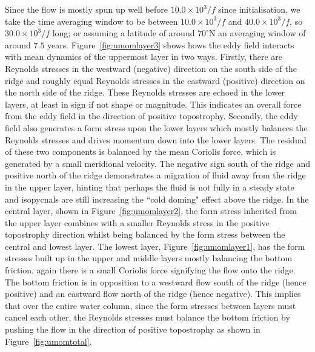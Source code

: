 \documentclass[12pt,a4paper]{report}
\newcommand*\figref[1]{Figure~\ref{#1}}
\begin{document}
 Since the flow is mostly spun up well before $10.0\times10^{3}/f$ since initialisation, we take the time averaging window to be between $10.0\times10^{3}/f$ and $40.0\times10^{3}/f$, so $30.0\times10^{3}/f$ long; or assuming a latitude of around  $70^{\circ}\mathrm{N}$ an
 averaging window of around $7.5$ years. 
 \figref{fig:umomlayer3} shows hows the eddy field interacts with mean dynamics of the
 uppermost layer
 in two ways. Firstly, there are Reynolds stresses in the westward (negative) direction
 on the south side of the ridge and roughly equal Reynolds stresses in the eastward (positive) direction on the north side of the ridge. These Reynolds
 stresses are echoed in the lower layers, at least in sign if not shape or magnitude.
 This indicates an overall force from the eddy field in the direction of 
 positive topostrophy. Secondly, the eddy field also generates a form stress
 upon the lower layers which mostly balances the Reynolds stresses and drives
 momentum down into the lower layers. The residual of these two components is balanced
 by the mean Coriolis force, which is generated by a small meridional velocity.
 The negative sign south of the ridge and positive north of the ridge demonstrates
 a migration of fluid away from the ridge in the upper layer, hinting that perhaps
 the fluid is not fully in a steady state and isopycnals are still increasing the 
 ``cold doming" effect above the ridge. In the central layer, shown in
 \figref{fig:umomlayer2}, the form stress inherited
 from the upper layer combines with a smaller Reynolds stress in the positive topostrophy
 direction whilst being balanced by the form stress between the central and lowest layer.
 The lowest layer, \figref{fig:umomlayer1}, has the form stresses built up in the 
 upper and middle layers mostly balancing the bottom friction, again
 there is a small Coriolis force signifying the flow onto the ridge. The bottom friction is 
 in opposition to a westward flow south of the ridge (hence positive) and an eastward
 flow north of the ridge (hence negative). This implies that over the entire
 water column, since the form stresses between layers must cancel each other, the 
 Reynolds stresses must balance the bottom friction by pushing the flow in the direction 
 of positive topostrophy as shown in \figref{fig:umomtotal}. 
 
 
 
\end{document}
